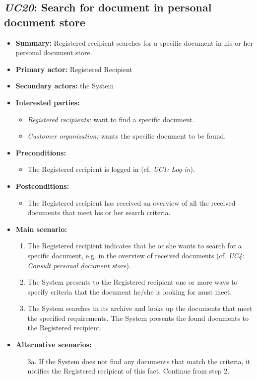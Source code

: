 \documentclass[a4paper,10pt]{article}
\begin{document}
\subsection{\emph{UC20}: Search for document in personal document store}
\begin{itemize}
    \item \textbf{Summary:} Registered recipient searches for a specific document in his or her personal document store. 
    \item \textbf{Primary actor:} Registered Recipient
	\item \textbf{Secondary actors:} the System
    \item \textbf{Interested parties:} 
        \begin{itemize}
        	\item \textit{Registered recipients:} want to find a specific document.
            \item \textit{Customer organization:} wants the specific document to be found.
        \end{itemize}

    \item \textbf{Preconditions:}
        \begin{itemize}
            \item The Registered recipient is logged in (cf. \emph{UC1: Log in}).
        \end{itemize}

    \item \textbf{Postconditions:}
        \begin{itemize}
            \item The Registered recipient has received an overview of all the received documents that meet his or her search criteria.
        \end{itemize}
        
    \item \textbf{Main scenario:} 
    \begin{enumerate}
       \item The Registered recipient indicates that he or she wants to search for a specific document, e.g. in the overview of received documents (cf. \emph{UC4: Consult personal document store}).
       \item The System presents to the Registered recipient one or more ways to specify criteria that the document he/she is looking for must meet.
       \item The System searches in its archive and looks up the documents that meet the specified requirements. The System presents the found documents to the Registered recipient.
     \end{enumerate}

    \item \textbf{Alternative scenarios:} 
    \begin{enumerate}
        \item [3a.] If the System does not find any documents that match the criteria, it notifies the Registered recipient of this fact. Continue from step 2.
    \end{enumerate}
\end{itemize}
\end{document}
